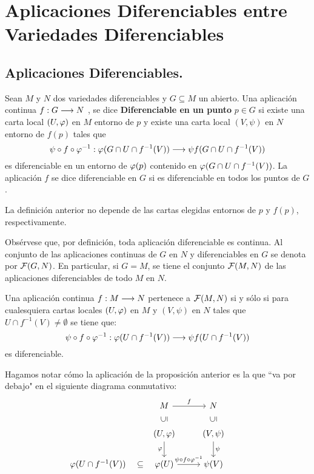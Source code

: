 \documentclass[cursovd_portada.tex]{subfiles}
\begin{document}
\chapter{Aplicaciones Diferenciables entre Variedades Diferenciables}
\section{Aplicaciones Diferenciables.}
\begin{defi}
Sean $M$ y $N$ dos variedades diferenciables y $G\subseteq M$ un abierto. Una aplicaci\'{o}n continua $f:G\longrightarrow N$ , se
dice {\bf Diferenciable en un punto} $p\in G$ si existe una carta local $(U,\varphi)$ en $M$ entorno de $p$ y existe
una carta local $(V,\psi)$ en $N$ entorno de $f(p)$ tales que
$$\psi\circ f\circ\varphi^{-1}:\varphi(G\cap U\cap f^{-1}(V))\longrightarrow\psi f(G\cap U\cap f^{-1}(V))$$
es diferenciable en un entorno de $\varphi(p)$ contenido en $\varphi(G\cap U\cap f^{-1}(V))$. La aplicaci\'{o}n $f$ se dice
diferenciable en $G$ si es diferenciable en todos los puntos de $G$.
\end{defi}
\begin{prop}
La definici\'{o}n anterior no depende de las cartas elegidas entornos de $p$ y $f(p)$, respectivamente.
\end{prop}
Obs\'{e}rvese que, por definici\'{o}n, toda aplicaci\'{o}n
diferenciable es continua. Al conjunto de las aplicaciones
continuas de $G$ en $N$ y diferenciables en $G$ se denota por
${\cal F}(G,N)$. En particular, si $G=M$, se tiene el conjunto
${\cal F}(M,N)$ de las aplicaciones diferenciables de todo $M$ en
$N$.
\begin{prop}
Una aplicaci\'{o}n continua $f:M\longrightarrow N$ pertenece a ${\cal F}(M,N)$ si y s\'{o}lo si para cualesquiera cartas locales
$(U,\varphi)$ en $M$ y $(V,\psi)$ en $N$ tales que $U\cap f^{-1}(V)\neq\emptyset$ se tiene que:
$$\psi\circ f\circ\varphi^{-1}:\varphi(U\cap f^{-1}(V))\longrightarrow\psi f(U\cap f^{-1}(V))$$
es diferenciable.
\end{prop}
Hagamos notar c\'omo la aplicaci\'on de la proposici\'on anterior es la que ``va por debajo" en el siguiente diagrama conmutativo:
\[
\begin{tikzcd}
& M  \arrow[r, "f"] & N & \\
& (U,\varphi)\arrow[u,phantom, "\rotatebox{90}{$\subseteq$}"]\arrow[d,"\varphi"']  & (V,\psi)\arrow[d,"\psi"]\arrow[u,phantom, "\rotatebox{90}{$\subseteq$}"] &  \\
\varphi(U\cap f^{-1}(V))\arrow[r,phantom, "{\subseteq}"] & \varphi(U) \arrow[r,"\psi\circ f\circ\varphi^{-1}"] & \psi(V)& 
\end{tikzcd}
\]
\end{document}
